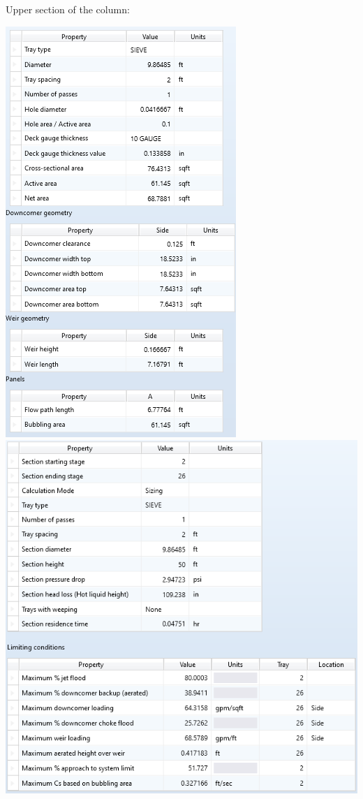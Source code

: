 \documentclass[12pt]{article}
\begin{document}
Upper section of the column:
\begin{center}
    \includegraphics{sieve 2 lower geometry.png}
    \includegraphics[scale=0.9]{sieve 2 lower results.png}
\end{center}
\end{document}
